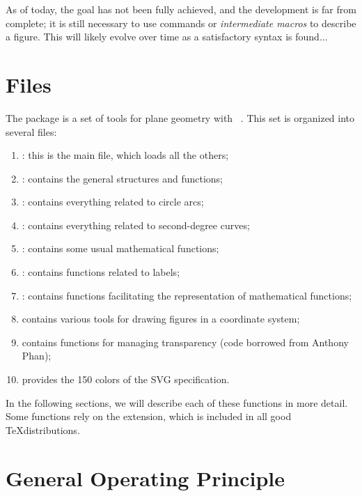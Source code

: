 \documentclass[a4paper,english]{article}
\begin{document}
\begin{Note} As of today, the goal has not been fully achieved, and the development is far from complete; it is still necessary to use \MP{} commands or \emph{intermediate macros} to describe a figure. This will likely evolve over time as a satisfactory syntax is found...
\end{Note}


\section{Files}

The \mpgeomdd package is a set of tools for plane geometry with
\MP~\cite{ctan-metapost}. This 
set is organized into several files:

\begin{enumerate}
\item {} : this is the main file, which loads all the
others;
\item {} : contains
    the general structures and functions;
\item {} :
    contains everything related to circle arcs;
\item {} :
    contains everything related to second-degree curves;
\item {} :
    contains some usual mathematical functions;
\item {} :
    contains functions related to labels;
\item {} :
    contains functions facilitating the representation of mathematical
    functions;
\item {}
    contains various tools for drawing figures in a coordinate system;
\item {}
    contains functions for managing transparency (code
    borrowed from Anthony Phan);
\item {} provides the 150 colors of the SVG specification.
\end{enumerate}

In the following sections, we will describe each of these
functions in more detail. Some functions rely on
the  extension, which is included in all good
\TeX distributions.

\section{General Operating Principle}
\end{document}
